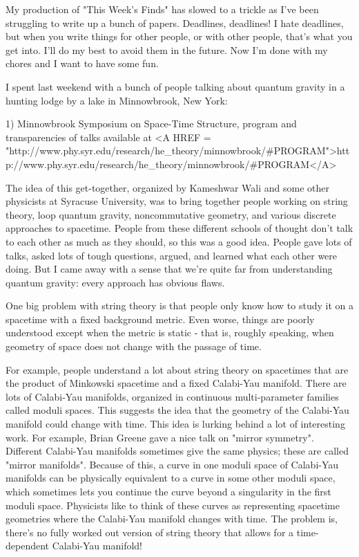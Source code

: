 


My production of "This Week's Finds" has slowed to a trickle
as I've been struggling to write up a bunch of papers.  Deadlines,
deadlines!  I hate deadlines, but when you write things for other
people, or with other people, that's what you get into.  I'll do my best
to avoid them in the future.  Now I'm done with my chores and I want to
have some fun.

I spent last weekend with a bunch of people talking about quantum 
gravity in a hunting lodge by a lake in Minnowbrook, New York:

1) Minnowbrook Symposium on Space-Time Structure, program and
transparencies of talks available at
<A HREF = "http://www.phy.syr.edu/research/he_theory/minnowbrook/#PROGRAM">http://www.phy.syr.edu/research/he_theory/minnowbrook/#PROGRAM</A>

The idea of this get-together, organized by Kameshwar Wali and some other
physicists at Syracuse University, was to bring together people working
on string theory, loop quantum gravity, noncommutative geometry, and
various discrete approaches to spacetime.  People from these different
schools of thought don't talk to each other as much as they should, so
this was a good idea.  People gave lots of talks, asked lots of tough
questions, argued, and learned what each other were doing.  But I came
away with a sense that we're quite far from understanding quantum
gravity: every approach has obvious flaws.  

One big problem with string theory is that people only know how to study
it on a spacetime with a fixed background metric.  Even worse, things
are poorly understood except when the metric is static - that is, roughly
speaking, when geometry of space does not change with the passage of time.  


For example, people understand a lot about string theory on spacetimes
that are the product of Minkowski spacetime and a fixed Calabi-Yau
manifold.  There are lots of Calabi-Yau manifolds, organized in
continuous multi-parameter families called moduli spaces.  This suggests
the idea that the geometry of the Calabi-Yau manifold could change with
time.  This idea is lurking behind a lot of interesting work.  For
example, Brian Greene gave a nice talk on "mirror symmetry".
Different Calabi-Yau manifolds sometimes give the same physics; these
are called "mirror manifolds".  Because of this, a curve in
one moduli space of Calabi-Yau manifolds can be physically equivalent to
a curve in some other moduli space, which sometimes lets you continue
the curve beyond a singularity in the first moduli space.  Physicists
like to think of these curves as representing spacetime geometries where
the Calabi-Yau manifold changes with time.  The problem is, there's no
fully worked out version of string theory that allows for a
time-dependent Calabi-Yau manifold!

